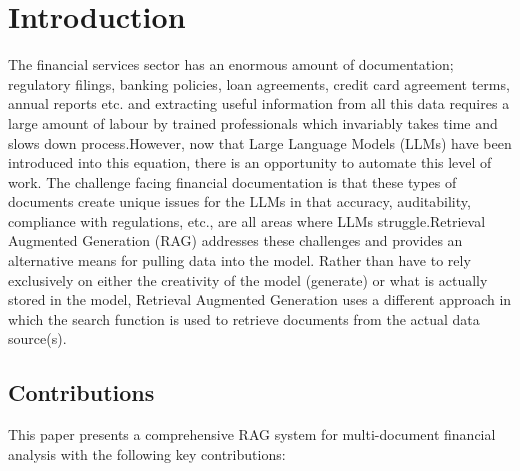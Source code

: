 \documentclass[runningheads]{llncs}
\begin{document}
\section{Introduction}

The financial services sector has an enormous amount of documentation; regulatory filings, banking policies, loan agreements, credit card agreement terms, annual reports etc. and extracting useful information from all this data requires a large amount of labour by trained professionals which invariably takes time and slows down process.However, now that Large Language Models (LLMs) have been introduced into this equation, there is an opportunity to automate this level of work. The challenge facing financial documentation is that these types of documents create unique issues for the LLMs in that accuracy, auditability, compliance with regulations, etc., are all areas where LLMs struggle.Retrieval Augmented Generation (RAG) addresses these challenges and provides an alternative means for pulling data into the model. Rather than have to rely exclusively on either the creativity of the model (generate) or what is actually stored in the model, Retrieval Augmented Generation uses a different approach in which the search function is used to retrieve documents from the actual data source(s).

\subsection{Contributions}

This paper presents a comprehensive RAG system for multi-document financial analysis with the following key contributions:
\end{document}
